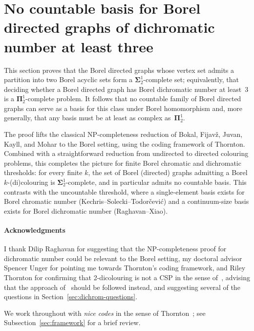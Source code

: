 
\section{No countable basis for Borel directed graphs of dichromatic number at least three}\label{sec:dichromatic}

This section proves that the Borel directed graphs whose vertex set admits a partition into two Borel acyclic sets form a $\mathbf\Sigma^1_2$-complete set; equivalently, that deciding whether a Borel directed graph has Borel dichromatic number at least~$3$ is a $\mathbf\Pi^1_2$-complete problem.
It follows that no countable family of Borel directed graphs can serve as a basis for this class under Borel homomorphism and, more generally, that any basis must be at least as complex as~$\mathbf\Pi^1_2$.

The proof lifts the classical NP-completeness reduction of Bokal, Fijavž, Juvan, Kayll, and Mohar to the Borel setting, using the coding framework of Thornton.
Combined with a straightforward reduction from undirected to directed colouring problems, this completes the picture for finite Borel chromatic and dichromatic thresholds: for every finite $k$, the set of Borel (directed) graphs admitting a Borel $k$-(di)colouring is $\mathbf\Sigma^1_2$-complete, and in particular admits no countable basis.
This contrasts with the uncountable threshold, where a single-element basis exists for Borel chromatic number (Kechris--Solecki--Todorčević) and a continuum-size basis exists for Borel dichromatic number (Raghavan--Xiao).

\paragraph{Acknowledgments}
I thank Dilip Raghavan for suggesting that the NP-completeness proof for dichromatic number could be relevant to the Borel setting, my doctoral advisor Spencer Unger for pointing me towards Thornton's coding framework, and Riley Thornton for confirming that 2-dicolouring is not a CSP in the sense of~\cite{thornton-thesis}, advising that the approach of~\cite[Appendix~A]{thornton2022algebraic} should be followed instead, and suggesting several of the questions in Section~\ref{sec:dichrom-questions}.

We work throughout with \emph{nice codes} in the sense of Thornton~\cite{thornton2022algebraic, thornton-thesis}; see Subsection~\ref{sec:framework} for a brief review.

